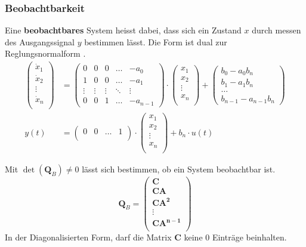 \subsubsection{Beobachtbarkeit}
Eine \textbf{beobachtbares} System heisst dabei, dass sich ein Zustand $x$ durch messen des Ausgangssignal $y$ bestimmen lässt. Die Form ist dual zur Reglungsnormalform .
\begin{align*}
	\begin{pmatrix}  \dot{x}_1 \\ 	\dot{x}_2 \\ \vdots \\ \dot{x}_n \\ \end{pmatrix}
	&=
	\begin{pmatrix}
		0 & 0 & 0 & \dots & -a_0\\
		1 & 0 & 0 & \dots & -a_1\\
		\vdots & \vdots & \vdots & \ddots & \vdots \\
		0 & 0 & 1 & \dots & -a_{n-1}
	\end{pmatrix}\cdot
	\begin{pmatrix}  {x}_1 \\ 	{x}_2 \\ \vdots\\ {x}_n \\ \end{pmatrix} +
	\begin{pmatrix} b_0-a_0b_n \\ b_1 - a_1b_n \\ \dots \\ b_{n-1}-a_{n-1}b_n\end{pmatrix}
	\\
	y(t) &= \begin{pmatrix}
		 0 & 0 & \dots &1 \\ 
	\end{pmatrix}\cdot
	\begin{pmatrix}  {x}_1 \\ 	{x}_2 \\ \vdots\\ {x}_n \\ \end{pmatrix}
	+ {b_n}\cdot u(t)
\end{align*}

Mit $\det(\mathbf{Q}_B) \neq 0$ lässt sich bestimmen, ob ein System beobachtbar ist.
\[
\mathbf{Q}_B = \begin{pmatrix}
	\mathbf{C} \\
	\mathbf{CA} \\
	\mathbf{CA^2} \\
	\vdots\\
	\mathbf{CA^{n-1}} \\
\end{pmatrix}
\]
In der Diagonalisierten Form, darf die Matrix $\mathbf{C}$ keine $0$ Einträge beinhalten.

